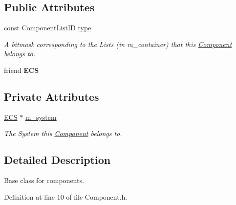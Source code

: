 \subsection*{Public Attributes}
\begin{DoxyCompactItemize}
\item 
\mbox{\label{classnta_1_1Component_a6c27f772281fd6ae13892386a75e7b4e}} 
const Component\+List\+ID \hyperlink{classnta_1_1Component_a6c27f772281fd6ae13892386a75e7b4e}{type}
\begin{DoxyCompactList}\small\item\em A bitmask corresponding to the Lists (in m\+\_\+container) that this \hyperlink{classnta_1_1Component}{Component} belongs to. \end{DoxyCompactList}\item 
\mbox{\label{classnta_1_1Component_abed0426a01836855941e0236441eaf76}} 
friend {\bfseries E\+CS}
\end{DoxyCompactItemize}
\subsection*{Private Attributes}
\begin{DoxyCompactItemize}
\item 
\mbox{\label{classnta_1_1Component_a382b6ded0bc1bfa123ac31a666d21b20}} 
\hyperlink{classnta_1_1ECS}{E\+CS} $\ast$ \hyperlink{classnta_1_1Component_a382b6ded0bc1bfa123ac31a666d21b20}{m\+\_\+system}
\begin{DoxyCompactList}\small\item\em The System this \hyperlink{classnta_1_1Component}{Component} belongs to. \end{DoxyCompactList}\end{DoxyCompactItemize}


\subsection{Detailed Description}
Base class for components. 

Definition at line 10 of file Component.\+h.



